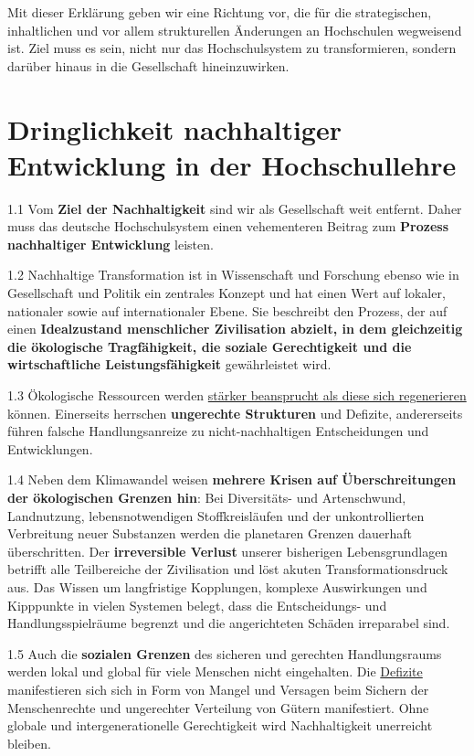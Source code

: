 \documentclass[DIV=12]{scrartcl}
\begin{document}
Mit dieser Erklärung geben wir eine Richtung vor, die für die
strategischen, inhaltlichen und vor allem strukturellen Änderungen an
Hochschulen wegweisend ist. Ziel muss es sein, nicht nur das
Hochschulsystem zu transformieren, sondern darüber hinaus in die
Gesellschaft hineinzuwirken.

\hypertarget{dringlichkeit-nachhaltiger-entwicklung-in-der-hochschullehre}{%
\section{Dringlichkeit nachhaltiger Entwicklung in der
Hochschullehre}\label{dringlichkeit-nachhaltiger-entwicklung-in-der-hochschullehre}}

1.1 Vom \textbf{Ziel der Nachhaltigkeit} sind wir als Gesellschaft weit
entfernt. Daher muss das deutsche Hochschulsystem einen vehementeren
Beitrag zum \textbf{Prozess nachhaltiger Entwicklung} leisten.

1.2 Nachhaltige Transformation ist in Wissenschaft und Forschung ebenso
wie in Gesellschaft und Politik ein zentrales Konzept und hat einen Wert
auf lokaler, nationaler sowie auf internationaler Ebene. Sie beschreibt
den Prozess, der auf einen \textbf{Idealzustand menschlicher
Zivilisation abzielt, in dem gleichzeitig die ökologische Tragfähigkeit,
die soziale Gerechtigkeit und die wirtschaftliche Leistungsfähigkeit}
gewährleistet wird.

1.3 Ökologische Ressourcen werden
\href{https://www.stockholmresilience.org/research/planetary-boundaries.html}{stärker
beansprucht als diese sich regenerieren} können. Einerseits herrschen
\textbf{ungerechte Strukturen} und Defizite, andererseits führen falsche
Handlungsanreize zu nicht-nachhaltigen Entscheidungen und Entwicklungen.

1.4 Neben dem Klimawandel weisen \textbf{mehrere Krisen auf
Überschreitungen der ökologischen Grenzen hin}: Bei Diversitäts- und
Artenschwund, Landnutzung, lebensnotwendigen Stoffkreisläufen und der
unkontrollierten Verbreitung neuer Substanzen werden die planetaren
Grenzen dauerhaft überschritten. Der \textbf{irreversible Verlust}
unserer bisherigen Lebensgrundlagen betrifft alle Teilbereiche der
Zivilisation und löst akuten Transformationsdruck aus. Das Wissen um
langfristige Kopplungen, komplexe Auswirkungen und Kipppunkte in vielen
Systemen belegt, dass die Entscheidungs- und Handlungsspielräume
begrenzt und die angerichteten Schäden irreparabel sind.

1.5 Auch die \textbf{sozialen Grenzen} des sicheren und gerechten
Handlungsraums werden lokal und global für viele Menschen nicht
eingehalten. Die
\href{https://www-cdn.oxfam.org/s3fs-public/file_attachments/dp-a-safe-and-just-space-for-humanity-130212-en_5.pdf}{Defizite}
manifestieren sich sich in Form von Mangel und Versagen beim Sichern der
Menschenrechte und ungerechter Verteilung von Gütern manifestiert. Ohne
globale und intergenerationelle Gerechtigkeit wird Nachhaltigkeit
unerreicht bleiben.
\end{document}
